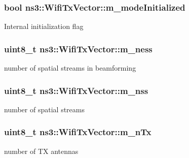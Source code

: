 \subsubsection[{\texorpdfstring{m\+\_\+mode\+Initialized}{m_modeInitialized}}]{\setlength{\rightskip}{0pt plus 5cm}bool ns3\+::\+Wifi\+Tx\+Vector\+::m\+\_\+mode\+Initialized\hspace{0.3cm}{\ttfamily [private]}}\hypertarget{classns3_1_1WifiTxVector_ae9b3585e860df26a5c87cfaa4f3275be}{}\label{classns3_1_1WifiTxVector_ae9b3585e860df26a5c87cfaa4f3275be}
Internal initialization flag 
\subsubsection[{\texorpdfstring{m\+\_\+ness}{m_ness}}]{\setlength{\rightskip}{0pt plus 5cm}uint8\+\_\+t ns3\+::\+Wifi\+Tx\+Vector\+::m\+\_\+ness\hspace{0.3cm}{\ttfamily [private]}}\hypertarget{classns3_1_1WifiTxVector_aeed6afcab5dabe7c72be58fb9b2c5a37}{}\label{classns3_1_1WifiTxVector_aeed6afcab5dabe7c72be58fb9b2c5a37}
number of spatial streams in beamforming 
\subsubsection[{\texorpdfstring{m\+\_\+nss}{m_nss}}]{\setlength{\rightskip}{0pt plus 5cm}uint8\+\_\+t ns3\+::\+Wifi\+Tx\+Vector\+::m\+\_\+nss\hspace{0.3cm}{\ttfamily [private]}}\hypertarget{classns3_1_1WifiTxVector_a83ab70bae9e8a33ef044b37c440c2475}{}\label{classns3_1_1WifiTxVector_a83ab70bae9e8a33ef044b37c440c2475}
number of spatial streams 
\subsubsection[{\texorpdfstring{m\+\_\+n\+Tx}{m_nTx}}]{\setlength{\rightskip}{0pt plus 5cm}uint8\+\_\+t ns3\+::\+Wifi\+Tx\+Vector\+::m\+\_\+n\+Tx\hspace{0.3cm}{\ttfamily [private]}}\hypertarget{classns3_1_1WifiTxVector_a6b5cc1cdfe19d4f7657e76fb9b771bd4}{}\label{classns3_1_1WifiTxVector_a6b5cc1cdfe19d4f7657e76fb9b771bd4}
number of TX antennas 
